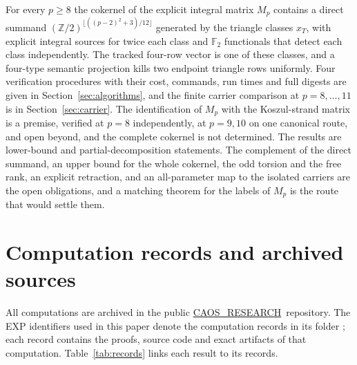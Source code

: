 \documentclass[11pt]{article}
\theoremstyle{definition}
\theoremstyle{remark}
\newcommand{\Z}{\mathbb Z}
\newcommand{\Repo}{\href{https://github.com/fsantibanezleal/CAOS_RESEARCH}{CAOS\_RESEARCH}}
\begin{document}
For every $p\geq8$ the cokernel of the explicit integral matrix $M_p$ contains a direct summand
$(\Z/2)^{\lfloor((p-2)^2+3)/12\rfloor}$ generated by the triangle classes $x_T$, with explicit integral
sources for twice each class and $\mathbb F_2$ functionals that detect each class independently. The
tracked four-row vector is one of these classes, and a four-type semantic projection kills two endpoint triangle rows
uniformly. Four verification procedures with their cost, commands, run times and full digests are given in
Section~\ref{sec:algorithms}, and the finite carrier comparison at $p=8,\ldots,11$ is in
Section~\ref{sec:carrier}. The identification of $M_p$ with the Koszul-strand matrix is a premise,
verified at $p=8$ independently, at $p=9,10$ on one canonical route, and open beyond, and the complete
cokernel is not determined.
The results are lower-bound and partial-decomposition statements. The complement of the direct summand,
an upper bound for the whole cokernel, the odd torsion and the free rank, an explicit retraction, and an
all-parameter map to the isolated carriers are the open obligations, and a matching theorem for the
labels of $M_p$ is the route that would settle them.

\appendix
\section{Computation records and archived sources}

All computations are archived in the public \Repo\ repository. The EXP
identifiers used in this paper denote the computation records in its folder
; each record
contains the proofs, source code and exact artifacts of that computation.
Table~\ref{tab:records} links each result to its records.
\end{document}

